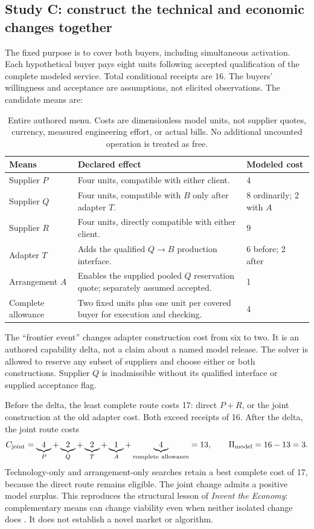 \documentclass[11pt,a4paper]{article}
\begin{document}
\subsection{Study C: construct the technical and economic changes together}
The fixed purpose is to cover both buyers, including simultaneous activation. Each hypothetical buyer pays eight units following accepted qualification of the complete modeled service. Total conditional receipts are 16. The buyers' willingness and acceptance are assumptions, not elicited observations. The candidate means are:
\begin{table}[H]\small
\begin{tabularx}{\textwidth}{@{}L{27mm}YL{25mm}@{}}\toprule
\textbf{Means} & \textbf{Declared effect} & \textbf{Modeled cost}\\\midrule
Supplier $P$ & Four units, compatible with either client. & 4\\
Supplier $Q$ & Four units, compatible with $B$ only after adapter $T$. & 8 ordinarily; 2 with $A$\\
Supplier $R$ & Four units, directly compatible with either client. & 9\\
Adapter $T$ & Adds the qualified $Q\rightarrow B$ production interface. & 6 before; 2 after\\
Arrangement $A$ & Enables the supplied pooled $Q$ reservation quote; separately assumed accepted. & 1\\
Complete allowance & Two fixed units plus one unit per covered buyer for execution and checking. & 4\\\bottomrule
\end{tabularx}
\caption{Entire authored menu. Costs are dimensionless model units, not supplier quotes, currency, measured engineering effort, or actual bills. No additional uncounted operation is treated as free.}
\end{table}

The ``frontier event'' changes adapter construction cost from six to two. It is an authored capability delta, not a claim about a named model release. The solver is allowed to reserve any subset of suppliers and choose either or both constructions. Supplier $Q$ is inadmissible without its qualified interface or supplied acceptance flag.

Before the delta, the least complete route costs 17: direct $P+R$, or the joint construction at the old adapter cost. Both exceed receipts of 16. After the delta, the joint route costs
\begin{equation}
C_{\rm joint}=\underbrace{4}_{P}+\underbrace{2}_{Q}+\underbrace{2}_{T}+\underbrace{1}_{A}+\underbrace{4}_{\rm complete\ allowance}=13,
\qquad \Pi_{\rm model}=16-13=3.\label{eq:base}
\end{equation}
Technology-only and arrangement-only searches retain a best complete cost of 17, because the direct route remains eligible. The joint change admits a positive model surplus. This reproduces the structural lesson of \emph{Invent the Economy}: complementary means can change viability even when neither isolated change does \cite[Sec.~3]{economy}. It does not establish a novel market or algorithm.
\end{document}
